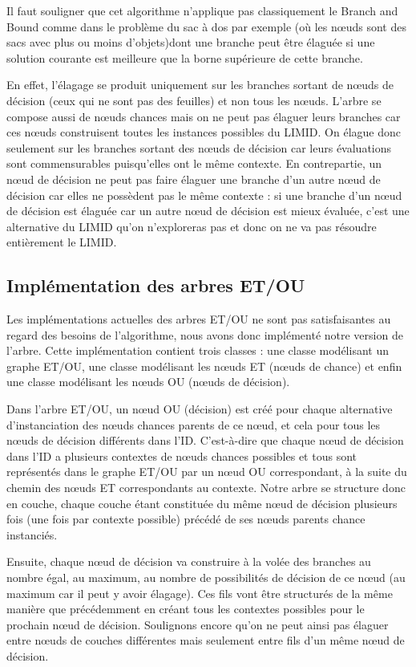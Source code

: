 \documentclass[12pt]{article}
\begin{document}
Il faut souligner que cet algorithme n'applique pas classiquement le Branch and Bound comme dans le problème du sac à dos par exemple (où les nœuds sont des sacs avec plus ou moins d'objets)dont une branche peut être élaguée si une solution courante est meilleure que la borne supérieure de cette branche. 

En effet, l'élagage se produit uniquement sur les branches sortant de nœuds de décision (ceux qui ne sont pas des feuilles) et non tous les nœuds. L'arbre se compose  aussi de nœuds chances mais on ne peut pas élaguer leurs branches car ces nœuds construisent toutes les instances possibles du LIMID. On élague donc seulement sur les branches sortant des nœuds de décision car leurs évaluations sont commensurables puisqu'elles ont le même contexte. En contrepartie, un nœud de décision ne peut pas faire élaguer une branche d'un autre nœud de décision car elles ne possèdent pas le même contexte : si une branche d'un nœud de décision est élaguée car un autre nœud de décision est mieux évaluée, c'est une alternative du LIMID qu'on n'exploreras pas et donc on ne va pas résoudre entièrement le LIMID.


\subsection{Implémentation des arbres ET/OU}
Les implémentations actuelles des arbres ET/OU ne sont pas satisfaisantes au regard des besoins de l'algorithme, nous avons donc implémenté notre version de l'arbre. Cette implémentation contient trois classes : une classe modélisant un graphe ET/OU, une classe modélisant les nœuds ET (nœuds de chance) et enfin une classe modélisant les nœuds OU (nœuds de décision).

Dans l'arbre ET/OU, un nœud OU (décision) est créé pour chaque alternative d'instancia\-tion des nœuds chances parents de ce nœud, et cela pour tous les nœuds de décision différents dans l'ID. C'est-à-dire que chaque nœud de décision dans l'ID a plusieurs contextes de nœuds chances possibles et tous sont représentés dans le graphe ET/OU par un nœud OU correspondant, à la suite du chemin des nœuds ET correspondants au contexte. Notre arbre se structure donc en couche, chaque couche étant constituée du même nœud de décision plusieurs fois (une fois par contexte possible) précédé de ses nœuds parents chance instanciés. 

Ensuite, chaque nœud de décision va construire à la volée des branches au nombre égal, au maximum, au nombre de possibilités de décision de ce nœud (au maximum car il peut y avoir élagage). Ces fils vont être structurés de la même manière que précédemment en créant tous les contextes possibles pour le prochain nœud de décision. Soulignons encore qu'on ne peut ainsi pas élaguer entre nœuds de couches différentes mais seulement entre fils d'un même nœud de décision.
\end{document}

